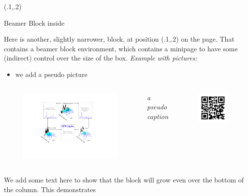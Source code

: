 	\begin{textblock}{.2}(.1,.2)
    \begin{block}{Beamer Block inside}
      \begin{minipage}[t][50cm][t]{\textwidth}	
		    Here is another, slightly narrower, block, at position (.1,.2) on the page.
        That contains a beamer block environment, which contains a minipage to 
        have some (indirect) control over the size of the box.
        \alert{\textit{Example with pictures:}}
        \begin{itemize}
        	\item we add a pseudo picture
        \end{itemize}
        \vspace{1cm}
        \begin{columns}
        	\begin{figure}[tb]
        	\begin{center}
        		\includegraphics[width=.55\textwidth]{images/content/FIG1.pdf}
        	\end{center}
        	\end{figure}
        \small{\textit{a pseudo caption}}
        \vspace{4cm}
        	\begin{figure}[tb]
        		\includegraphics[width=.6\textwidth]{images/qrcode-RSCAPE.jpg}
        	\end{figure}
        \end{columns}
        \vspace{1cm}
        We add some text here to show that the block will grow even over the bottom of the column. This demonstrates
            \end{minipage}
           \end{block}
        \end{textblock}
